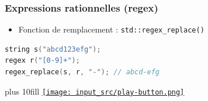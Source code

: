 \documentclass[C++.tex]{subfiles}
\begin{document}
\begin{frame}[fragile]
	\frametitle{Expressions rationnelles (regex)}
	\begin{itemize}
		\item Fonction de remplacement : \lstinline|std::regex_replace()|
	\end{itemize}

	\begin{lstlisting}[language=C++]
string s("abcd123efg");
regex r("[0-9]+");
regex_replace(s, r, "-"); // abcd-efg\end{lstlisting}

	\vskip 10mm plus 10fill
	\hfill
	\href{https://godbolt.org/#g:!((g:!((g:!((h:codeEditor,i:(filename:'1',fontScale:14,fontUsePx:'0',j:1,lang:c%2B%2B,selection:(endColumn:1,endLineNumber:27,positionColumn:1,positionLineNumber:27,selectionStartColumn:1,selectionStartLineNumber:27,startColumn:1,startLineNumber:27),source:'%23include+%3Ciostream%3E%0A%23include+%3Cstring%3E%0A%23include+%3Cregex%3E%0A%0Aint+main()%0A%7B%0A++%7B%0A++++std::string+s(%22abcd123efg%22)%3B%0A++++std::regex+r(%22%5B0-9%5D%2B%22)%3B%0A++++std::smatch+m%3B%0A%0A++++std::regex_search(s,+m,+r)%3B%0A++++std::cout+%3C%3C+m.size()+%3C%3C+!'%5Cn!'%3B%0A++++std::cout+%3C%3C+m.str(0)+%3C%3C+!'%5Cn!'%3B%0A++++std::cout+%3C%3C+m.position(0)+%3C%3C+!'%5Cn!'%3B%0A++++std::cout+%3C%3C+m.prefix()+%3C%3C+!'%5Cn!'%3B%0A++++std::cout+%3C%3C+m.suffix()+%3C%3C+!'%5Cn!'%3B%0A++%7D%0A%0A++%7B%0A++++std::string+s(%22abcd123efg%22)%3B%0A++++std::regex+r(%22%5B0-9%5D%2B%22)%3B%0A%0A++++std::cout+%3C%3C+std::regex_replace(s,+r,+%22-%22)+%3C%3C+!'%5Cn!'%3B%0A++%7D%0A%7D%0A'),l:'5',n:'0',o:'C%2B%2B+source+%231',t:'0')),k:50,l:'4',n:'0',o:'',s:0,t:'0'),(g:!((h:executor,i:(argsPanelShown:'1',compilationPanelShown:'0',compiler:g112,compilerOutShown:'0',execArgs:'',execStdin:'',fontScale:14,fontUsePx:'0',j:1,lang:c%2B%2B,libs:!((name:boost,ver:'175')),options:'-std%3Dc%2B%2B11',source:1,stdinPanelShown:'1',tree:'1',wrap:'0'),l:'5',n:'0',o:'Executor+x86-64+gcc+11.2+(C%2B%2B,+Editor+%231)',t:'0')),header:(),k:50,l:'4',n:'0',o:'',s:0,t:'0')),l:'2',n:'0',o:'',t:'0')),version:4}{\texttt{[image: input\_src/play-button.png]}}
\end{frame}
\end{document}
